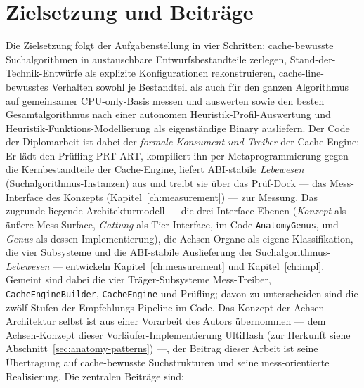 \section{Zielsetzung und Beiträge}\label{sec:contributions}
Die Zielsetzung folgt der Aufgabenstellung in vier Schritten: cache-bewusste Suchalgorithmen in
austauschbare Entwurfsbestandteile zerlegen, Stand-der-Technik-Entwürfe als explizite Konfigurationen
rekonstruieren, cache-line-bewusstes Verhalten sowohl je Bestandteil als auch für den ganzen Algorithmus
auf gemeinsamer CPU-only-Basis messen und auswerten sowie den besten Gesamtalgorithmus nach einer autonomen
Heuristik-Profil-Auswertung und Heuristik-Funktions-Modellierung als eigenständige Binary ausliefern.
Der Code der Diplomarbeit ist dabei der \emph{formale Konsument und Treiber} der Cache-Engine: Er lädt den
Prüfling PRT-ART, kompiliert ihn per Metaprogrammierung gegen die Kernbestandteile der Cache-Engine, liefert
ABI-stabile \emph{Lebewesen} (Suchalgorithmus-Instanzen) aus und treibt sie über das Prüf-Dock --- das
Mess-Interface des Konzepts (Kapitel~\ref{ch:measurement}) --- zur Messung.
Das zugrunde liegende Architekturmodell
--- die drei Interface-Ebenen (\emph{Konzept} als äußere Mess-Surface, \emph{Gattung} als
Tier-Interface, im Code \texttt{AnatomyGenus}, und \emph{Genus} als dessen Implementierung), die
Achsen-Or\-ga\-ne als eigene Klassifikation, die vier Subsysteme und die ABI-stabile Auslieferung der Suchalgorithmus-\emph{Lebewesen}
--- entwickeln
Kapitel~\ref{ch:measurement} und Kapitel~\ref{ch:impl}. Gemeint sind dabei die vier Träger-Subsysteme
Mess-Treiber, \texttt{CacheEngineBuilder}, \texttt{CacheEngine} und Prüfling; davon zu unterscheiden sind
die zwölf Stufen der Empfehlungs-Pipeline im Code. Das Konzept der Achsen-Architektur selbst ist aus einer
Vorarbeit des Autors übernommen --- dem Achsen-Konzept dieser Vorläufer-Implementierung UltiHash (zur Herkunft siehe
Abschnitt~\ref{sec:anatomy-patterns}) ---, der Beitrag dieser Arbeit ist
seine Übertragung auf cache-bewusste Suchstrukturen und seine mess-orientierte Realisierung. Die
zentralen Beiträge sind:

